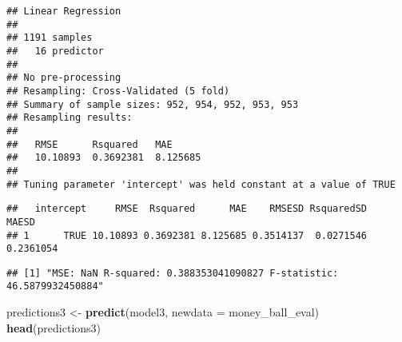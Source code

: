\documentclass[
]{article}
\newenvironment{Shaded}{\begin{snugshade}}{\end{snugshade}}
\newcommand{\AttributeTok}[1]{\textcolor[rgb]{0.13,0.29,0.53}{#1}}
\newcommand{\DecValTok}[1]{\textcolor[rgb]{0.00,0.00,0.81}{#1}}
\newcommand{\FunctionTok}[1]{\textcolor[rgb]{0.13,0.29,0.53}{\textbf{#1}}}
\newcommand{\NormalTok}[1]{#1}
\newcommand{\OtherTok}[1]{\textcolor[rgb]{0.56,0.35,0.01}{#1}}
\newcommand{\SpecialCharTok}[1]{\textcolor[rgb]{0.81,0.36,0.00}{\textbf{#1}}}
\newcommand{\StringTok}[1]{\textcolor[rgb]{0.31,0.60,0.02}{#1}}
\begin{document}
\begin{verbatim}
## Linear Regression 
## 
## 1191 samples
##   16 predictor
## 
## No pre-processing
## Resampling: Cross-Validated (5 fold) 
## Summary of sample sizes: 952, 954, 952, 953, 953 
## Resampling results:
## 
##   RMSE      Rsquared   MAE     
##   10.10893  0.3692381  8.125685
## 
## Tuning parameter 'intercept' was held constant at a value of TRUE
\end{verbatim}

\begin{Shaded}
\end{Shaded}

\begin{verbatim}
##   intercept     RMSE  Rsquared      MAE    RMSESD RsquaredSD     MAESD
## 1      TRUE 10.10893 0.3692381 8.125685 0.3514137  0.0271546 0.2361054
\end{verbatim}

\begin{Shaded}
\end{Shaded}

\begin{verbatim}
## [1] "MSE: NaN R-squared: 0.388353041090827 F-statistic: 46.5879932450884"
\end{verbatim}

\begin{Shaded}
\begin{Highlighting}[]
\NormalTok{predictions3 }\OtherTok{\textless{}{-}} \FunctionTok{predict}\NormalTok{(model3, }\AttributeTok{newdata =}\NormalTok{ money\_ball\_eval)}
\FunctionTok{head}\NormalTok{(predictions3)}
\end{Highlighting}
\end{Shaded}
\end{document}
